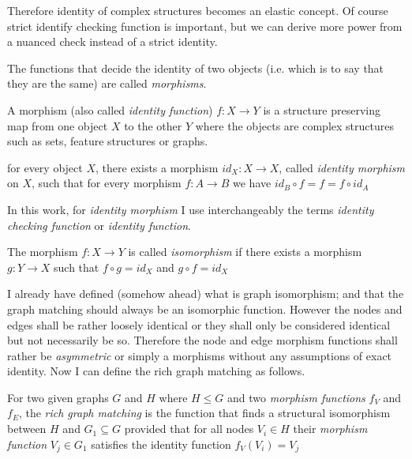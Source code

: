 Therefore identity of complex structures becomes an elastic concept. Of course strict identify checking function is important, but we can derive more power from a nuanced check instead of a strict identity. 

The functions that decide the identity of two objects (i.e. which is to say that they are the same) are called \textit{morphisms}.   

\begin{definition}[Morphism]\label{def:morphism}
	A morphism (also called \textit{identity function}) $f:X \rightarrow Y$ is a structure preserving map from one object $X$ to the other $Y$ where the objects are complex structures such as sets, feature structures or graphs.
\end{definition}

\begin{definition}\label{def:identity-morphism}
	for every object $X$, there exists a morphism $id_{X}:X \rightarrow X$, called \textit{identity morphism} on $X$, such that for every morphism $f:A \rightarrow B$ we have $id_{B} \circ f = f = f \circ id_{A}$
\end{definition}

In this work, for \textit{identity morphism} I use interchangeably the terms \textit{identity checking function} or \textit{identity function}.

\begin{definition}[Isomorphism]\label{def:isomorphism}
	The morphism $f:X \rightarrow Y$ is called \textit{isomorphism} if there exists a morphism $g:Y \rightarrow X$ such that $f \circ g = id_{X}$ and $ g \circ f = id_{X}$
\end{definition}

I already have defined (somehow ahead) what is graph isomorphism; and that the graph matching should always be an isomorphic function. However the nodes and edges shall be rather loosely identical or they shall only be considered identical but not necessarily be so. Therefore the node and edge morphism functions shall rather be \textit{asymmetric} or simply a morphisms without any assumptions of exact identity. Now I can define the rich graph matching as follows.  

\begin{definition}\label{def:rgmatching}
	For two given graphs $G$ and $H$ where $H \leq G$ and two \textit{morphism functions} $f_{V}$ and $f_{E}$, the \textit{rich graph matching} is the function that finds a structural isomorphism between $H$ and $G_{1} \subseteq G$ provided that for all nodes $V_{i} \in H$ their \textit{morphism function} $V_{j} \in G_{1}$ satisfies the identity function $f_{V}(V_{i})=V_{j}$ 
\end{definition}

